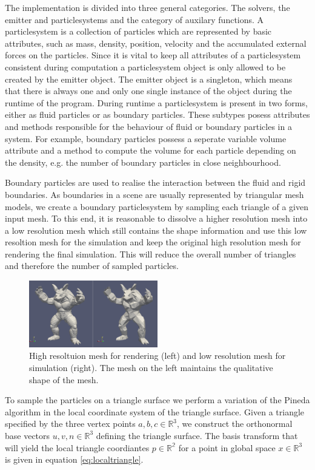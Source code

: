 \documentclass[11pt, letterpaper, twocolumn]{article}
\begin{document}
The implementation is divided into three general categories. The solvers, the emitter and particlesystems and the category of auxilary functions. A particlesystem is a collection of particles which are represented by basic attributes, such as mass, density, position, velocity and the accumulated external forces on the particles. Since it is vital to keep all attributes of a particlesystem consistent during computation a particlesystem object is only allowed to be created by the emitter object. The emitter object is a singleton, which means that there is always one and only one single instance of the object during the runtime of the program. During runtime a particlesystem is present in two forms, either as fluid particles or as boundary particles. These subtypes posess attributes and methods responsible for the behaviour of fluid or boundary particles in a system. For example, boundary particles possess a seperate variable volume attribute and a method to compute the volume for each particle depending on the density, e.g. the number of boundary particles in close neighbourhood.

Boundary particles are used to realise the interaction between the fluid and rigid boundaries. As boundaries in a scene are usually represented by triangular mesh models, we create a boundary particlesystem by sampling each triangle of a given input mesh. To this end, it is reasonable to dissolve a higher resolution mesh into a low resolution mesh which still contains the shape information and use this low resoltion mesh for the simulation and keep the original high resolution mesh for rendering the final simulation. This will reduce the overall number of triangles and therefore the number of sampled particles.

\begin{figure}[ht]
    \centering
    \includegraphics[width=0.5\textwidth]{images/mesh.png}
    \caption{High resoltuion mesh for rendering (left) and low resolution mesh for simulation (right). The mesh on the left maintains the qualitative shape of the mesh.}
    \label{fig:mesh}
\end{figure}


To sample the particles on a triangle surface we perform a variation of the Pineda algorithm \cite{pineda1988} in the local coordinate system of the triangle surface. Given a triangle specified by the three vertex points \(a, b, c \in \mathbb{R}^3\), we construct the orthonormal base vectors \(u,v,n \in \mathbb{R}^3\) defining the triangle surface. The basis transform that will yield the local triangle coordiantes \(p \in \mathbb{R^2}\) for a point in global space \(x \in \mathbb{R}^3\) is given in equation \ref{eq:localtriangle}.
\end{document}
